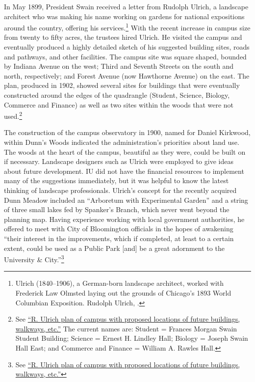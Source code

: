 \documentclass[
  american,
  letterpaper,
]{scrreprt}
\begin{document}
In May 1899, President Swain received a letter from Rudolph Ulrich, a
landscape architect who was making his name working on gardens for
national expositions around the country, offering his
services.\footnote{Ulrich (1840--1906), a German-born landscape
  architect, worked with Frederick Law Olmsted laying out the grounds of
  Chicago's 1893 World Columbian Exposition. Rudolph Ulrich,
  .} With the recent increase in
campus size from twenty to fifty acres, the trustees hired Ulrich. He
visited the campus and eventually produced a highly detailed sketch of
his suggested building sites, roads and pathways, and other facilities.
The campus site was square shaped, bounded by Indiana Avenue on the
west; Third and Seventh Streets on the south and north, respectively;
and Forest Avenue (now Hawthorne Avenue) on the east. The plan, produced
in 1902, showed several sites for buildings that were eventually
constructed around the edges of the quadrangle (Student, Science,
Biology, Commerce and Finance) as well as two sites within the woods
that were not used.\footnote{See
  \href{http://purl.dlib.indiana.edu/iudl/archives/photos/P0029898}{``R.
  Ulrich plan of campus with proposed locations of future buildings,
  walkways, etc.''} The current names are: Student = Frances Morgan
  Swain Student Building; Science = Ernest H. Lindley Hall; Biology =
  Joseph Swain Hall East; and Commerce and Finance = William A. Rawles
  Hall.}

The construction of the campus observatory in 1900, named for Daniel
Kirkwood, within Dunn's Woods indicated the administration's priorities
about land use. The woods at the heart of the campus, beautiful as they
were, could be built on if necessary. Landscape designers such as Ulrich
were employed to give ideas about future development. IU did not have
the financial resources to implement many of the suggestions
immediately, but it was helpful to know the latest thinking of landscape
professionals. Ulrich's concept for the recently acquired Dunn Meadow
included an ``Arboretum with Experimental Garden'' and a string of three
small lakes fed by Spanker's Branch, which never went beyond the
planning map. Having experience working with local government
authorities, he offered to meet with City of Bloomington officials in
the hopes of awakening ``their interest in the improvements, which if
completed, at least to a certain extent, could be used as a Public Park
{[}and{]} be a great adornment to the University \& City.''\footnote{See
  \href{http://purl.dlib.indiana.edu/iudl/archives/photos/P0029898}{``R.
  Ulrich plan of campus with proposed locations of future buildings,
  walkways, etc.''}}
\end{document}
